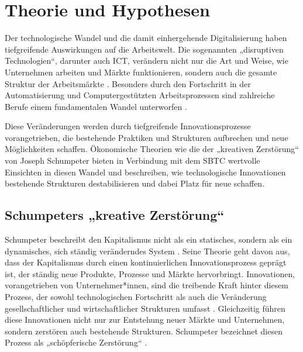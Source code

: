\section{Theorie und Hypothesen}

Der technologische Wandel und die damit einhergehende Digitalisierung haben tiefgreifende 
Auswirkungen auf die Arbeitswelt. Die sogenannten „disruptiven Technologien“, darunter auch 
\ac{ICT}, verändern nicht nur die Art und Weise, wie Unternehmen arbeiten und Märkte 
funktionieren, sondern auch die gesamte Struktur der Arbeitsmärkte 
\parencite[vgl.][S. 27]{brynjolfsson2014thesecond}. Besonders durch den Fortschritt in der 
Automatisierung und Computergestützten Arbeitsprozessen sind zahlreiche Berufe einem 
fundamentalen Wandel unterworfen \parencite[vgl.][S. 256]{frey2013thefuture}.

Diese Veränderungen werden durch tiefgreifende Innovationsprozesse vorangetrieben, die 
bestehende Praktiken und Strukturen aufbrechen und neue Möglichkeiten schaffen. Ökonomische 
Theorien wie die der „kreativen Zerstörung“ von Joseph Schumpeter 
\parencite[vgl.][S. 81]{schumpeter1976capitalism} bieten in Verbindung mit dem \ac{SBTC} 
wertvolle Einsichten in diesen Wandel und beschreiben, wie technologische Innovationen 
bestehende Strukturen destabilisieren und dabei Platz für neue schaffen.


\subsection{Schumpeters „kreative Zerstörung“}

Schumpeter beschreibt den Kapitalismus nicht als ein statisches, sondern als ein 
dynamisches, sich ständig veränderndes System 
\parencite[vgl.][S. 82]{schumpeter1976capitalism}. 
Seine Theorie geht davon aus, dass der Kapitalismus durch einen kontinuierlichen 
Innovationsprozess geprägt ist, der ständig neue Produkte, Prozesse und Märkte hervorbringt. 
Innovationen, vorangetrieben von Unternehmer*innen, sind die treibende Kraft hinter diesem 
Prozess, der sowohl technologischen Fortschritt als auch die Veränderung gesellschaftlicher 
und wirtschaftlicher Strukturen umfasst \parencite[vgl.][S. 82]{schumpeter1976capitalism}. 
Gleichzeitig führen diese Innovationen nicht nur zur Entstehung neuer Märkte und 
Unternehmen, sondern zerstören auch bestehende Strukturen. Schumpeter bezeichnet diesen 
Prozess als „schöpferische Zerstörung“ 
\parencite[vgl.][S. 103–105]{schumpeter1976capitalism}.

